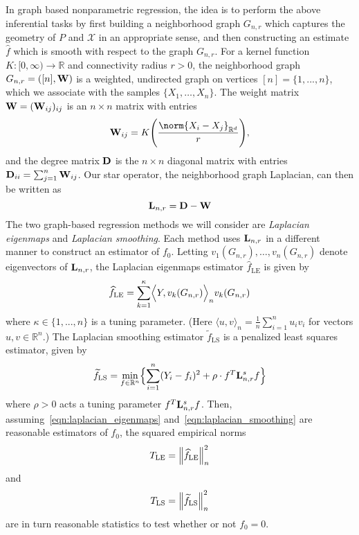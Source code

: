 \documentclass{article}
\newcommand{\Reals}{\mathbb{R}}
\newcommand{\1}{\mathbf{1}}
\newcommand{\Rd}{\Reals^d}
\newcommand{\Lap}{{\bf L}}
\newcommand{\mc}[1]{\mathcal{#1}}
\newcommand{\dotp}[2]{\langle #1, #2 \rangle}
\newcommand{\Dotp}[2]{\Bigl\langle #1, #2 \Bigr\rangle}
\newcommand{\wt}[1]{\widetilde{#1}}
\newcommand{\wh}[1]{\widehat{#1}}
\newcommand{\LE}{\mathrm{LE}}
\newcommand{\LS}{\mathrm{LS}}
\theoremstyle{alden}
\theoremstyle{aldenthm}
\theoremstyle{definition}
\theoremstyle{remark}
\begin{document}
In graph based nonparametric regression, the idea is to perform the above inferential tasks by first building a neighborhood graph $G_{n,r}$ which captures the geometry of $P$ and $\mc{X}$ in an appropriate sense, and then constructing an estimate $\wh{f}$ which is smooth with respect to the graph $G_{n,r}$. For a kernel function $K: [0,\infty) \to \Reals$ and connectivity radius $r > 0$, the neighborhood graph $G_{n,r} = ([n],{\bf W})$ is a weighted, undirected graph on vertices $[n] = \{1,...,n\}$, which we associate with the samples $\{X_1,\ldots,X_n\}$. The weight matrix ${\bf W} = ({\bf W}_{ij})_{ij}$ is an $n \times n$ matrix with entries
\begin{equation*}
\label{eqn:neighborhood_graph}
{\bf W}_{ij} = K\Biggl(\frac{\norm{X_i - X_j}_{\Rd}}{r}\Biggr),
\end{equation*}
and the degree matrix ${\bf D}$ is the $n \times n$ diagonal matrix with entries ${\bf D}_{ii} = \sum_{j = 1}^{n}{\bf W}_{ij}$.  Our star operator, the neighborhood graph Laplacian, can then be written as
\begin{equation}
\label{eqn:graph_Laplacian}
\Lap_{n,r} = \bf{D} - \bf{W}
\end{equation}
The two graph-based regression methods we will consider are \emph{Laplacian eigenmaps} and \emph{Laplacian smoothing}. Each method uses $\Lap_{n,r}$ in a different manner to construct an estimator of $f_0$. Letting $v_1(G_{n,r}),\ldots,v_n(G_{n,r})$ denote eigenvectors of $\Lap_{n,r}$, the Laplacian eigenmaps estimator $\wh{f}_{\LE}$ \citep{belkin2003} is given by 
\begin{equation}
\label{eqn:laplacian_eigenmaps}
\wh{f}_{\textrm{LE}} = \sum_{k = 1}^{\kappa} \Dotp{Y}{v_k(G_{n,r})}_n v_{k}(G_{n,r})
\end{equation}
where $\kappa \in \{1,...,n\}$ is a tuning parameter. (Here $\dotp{u}{v}_n = \frac{1}{n}\sum_{i = 1}^{n} u_i v_i$ for vectors $u,v \in \Reals^n$.) The Laplacian smoothing estimator $\wt{f}_{\LS}$ \citep{smola2003} is a penalized least squares estimator, given by
\begin{equation}
\label{eqn:laplacian_smoothing}
\wt{f}_{\LS}= \min_{f \in \Reals^n} \Bigl\{\sum_{i = 1}^{n}(Y_i - f_i)^2 + \rho \cdot f^T \Lap_{n,r}^s f \Bigr\}
\end{equation}
where $\rho > 0$ acts a tuning parameter $f^T \Lap_{{n,r}}^s f$. Then, assuming~\eqref{eqn:laplacian_eigenmaps} and~\eqref{eqn:laplacian_smoothing} are reasonable estimators of $f_0$, the squared empirical norms
\begin{equation}
T_{\LE} = \Bigl\|\wh{f}_{\LE}\Bigr\|_n^2 \label{eqn:laplacian_eigenmaps_test}
\end{equation}
and
\begin{equation}
T_{\LS} = \Bigl\|\wt{f}_{\LS}\Bigr\|_n^2 \label{eqn:laplacian_smoothing_test}
\end{equation}
are in turn reasonable statistics to test whether or not $f_0 = 0$.
\end{document}
